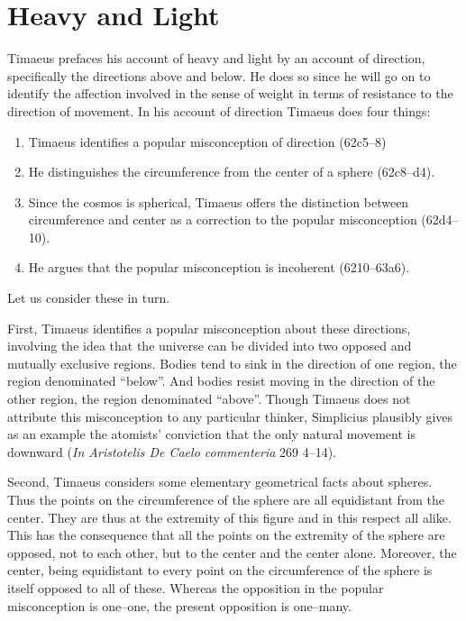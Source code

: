 
\section{Heavy and Light} %
\label{sec:heavy_and_light}

Timaeus prefaces his account of heavy and light by an account of direction, specifically the directions above and below. He does so since he will go on to identify the affection involved in the sense of weight in terms of resistance to the direction of movement. In his account of direction Timaeus does four things:
\begin{enumerate}[(1)]
	\item Timaeus identifies a popular misconception of direction (62c5--8)
	\item He distinguishes the circumference from the center of a sphere (62c8--d4).
	\item Since the cosmos is spherical, Timaeus offers the distinction between circumference and center as a correction to the popular misconception (62d4--10).
	\item He argues that the popular misconception is incoherent (6210--63a6).
\end{enumerate}
Let us consider these in turn.

First, Timaeus identifies a popular misconception about these directions, involving the idea that the universe can be divided into two opposed and mutually exclusive regions. Bodies tend to sink in the direction of one region, the region denominated ``below''. And bodies resist moving in the direction of the other region, the region denominated ``above''. Though Timaeus does not attribute this misconception to any particular thinker, Simplicius plausibly gives as an example the atomists' conviction that the only natural movement is downward (\emph{In Aristotelis De Caelo commenteria} 269 4--14).

Second, Timaeus considers some elementary geometrical facts about spheres. Thus the points on the circumference of the sphere are all equidistant from the center. They are thus at the extremity of this figure and in this respect all alike. This has the consequence that all the points on the extremity of the sphere are opposed, not to each other, but to the center and the center alone. Moreover, the center, being equidistant to every point on the circumference of the sphere is itself opposed to all of these. Whereas the opposition in the popular misconception is one--one, the present opposition is one--many.

